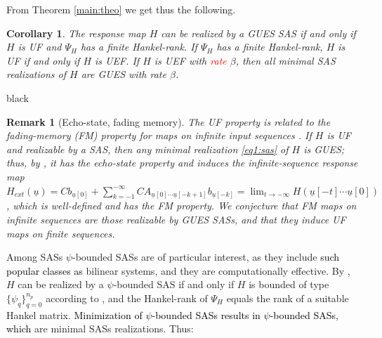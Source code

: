 \documentclass[journal,twoside,web]{ieeecolor}
\newtheorem{Corollary}[Theorem]{Corollary}
\newtheorem{Remark}[Theorem]{Remark}
\newcommand{\Rank}{\mathrm{Rank}}
\begin{document}
   From Theorem \ref{main:theo} we get thus  the following.
   \begin{Corollary}
   \label{col:sas}
      The response map 
        $H$ can be realized by a GUES SAS 
        if and only if $H$ is UF  and 
        $\Psi_H$ has a finite Hankel-rank.
        If $\Psi_H$ has a finite Hankel-rank, $H$ is UF if and only if $H$ is UEF.
	   If $H$ is UEF with \textcolor{red}{rate} $\beta$, then all minimal SAS realizations of $H$ are GUES with rate $\beta$. 
         \end{Corollary}
         \begin{color}{black}
       \begin{Remark}[Echo-state, fading memory]
        \label{rem:echo_fading}
      The UF property is related to the \emph{fading-memory (FM)} property for maps on infinite input sequences \cite{Ortega3, Ortega4}. If $H$ is UF and realizable by a SAS, then any minimal realization \eqref{eq1:sas} of $H$ is GUES; thus, by \cite[Theorem 1]{Ortega4}, it has the echo-state property and induces the infinite-sequence response map
      \( H_{ext}(\underline{u}) = Cb_{\underline{u}[0]} + \sum_{k=-1}^{-\infty} CA_{\underline{u}[0]\cdots \underline{u}[-k+1]}b_{\underline{u}[-k]} = 
      \lim_{t \to -\infty} H(\underline{u}[-t] \cdots \underline{u}[0]) \),
      which is well-defined and has the FM property. We conjecture that FM maps on infinite sequences are those realizable by GUES SASs, and that they induce UF maps on finite sequences.
      \end{Remark}  
    \end{color}
    Among SASs $\psi$-bounded SASs are of particular interest, as they include \textcolor{black}{such popular classes as} bilinear systems, and they are computationally effective.
  By \cite{Son:Real}, $H$ can be realized by a $\psi$-bounded SAS if and only if $H$ is bounded of type $\{\psi_{q}\}_{q=0}^{n_p}$ according to \textcolor{black}{\cite[Definition 1.15]{Son:Real}}, and the Hankel-rank of $\Psi_H$ equals the rank of a suitable Hankel matrix. \textcolor{black}{Minimization of  $\psi$-bounded SASs results in $\psi$-bounded SASs, which} are minimal SASs realizations. Thus:
\end{document}

